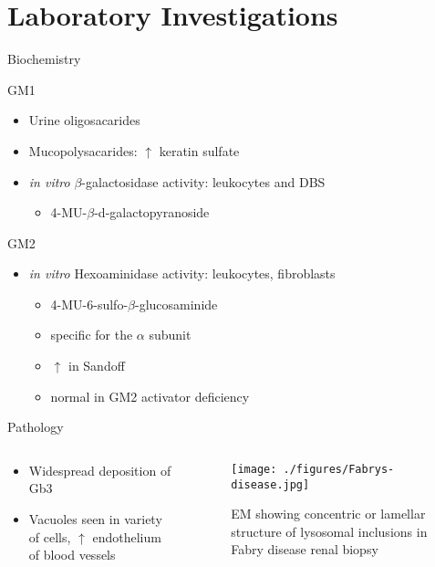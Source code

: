 \documentclass[presentation, smaller]{beamer}
\begin{document}
\section{Laboratory Investigations}
\label{sec:orgheadline18}

\begin{frame}[label={sec:orgheadline16}]{Biochemistry}
\begin{block}{GM1}
\begin{itemize}
\item Urine oligosacarides
\item Mucopolysacarides: \(\uparrow\) keratin sulfate
\item \emph{in vitro} \(\beta\)-galactosidase activity: leukocytes and DBS
\begin{itemize}
\item 4-MU-\(\beta\)-d-galactopyranoside
\end{itemize}
\end{itemize}
\end{block}

\begin{block}{GM2}
\begin{itemize}
\item \emph{in vitro} Hexoaminidase activity: leukocytes, fibroblasts
\begin{itemize}
\item 4-MU-6-sulfo-\(\beta\)-glucosaminide
\item specific for the \(\alpha\) subunit
\item \(\uparrow\) in Sandoff
\item normal in GM2 activator deficiency
\end{itemize}
\end{itemize}
\end{block}
\end{frame}

\begin{frame}[label={sec:orgheadline17}]{Pathology}
\begin{columns}
\begin{column}{0.5\columnwidth}
\begin{itemize}
\item Widespread deposition of Gb3
\item Vacuoles seen in variety of cells, \(\uparrow\) endothelium of blood vessels
\end{itemize}
\end{column}

\begin{column}{0.5\columnwidth}
\begin{figure}[htb]
\centering
\texttt{[image: ./figures/Fabrys-disease.jpg]}
\caption[em]{\label{fig:biopsy}
EM showing concentric or lamellar structure of lysosomal inclusions in Fabry disease renal biopsy}
\end{figure}
\end{column}
\end{columns}
\end{frame}
\end{document}
